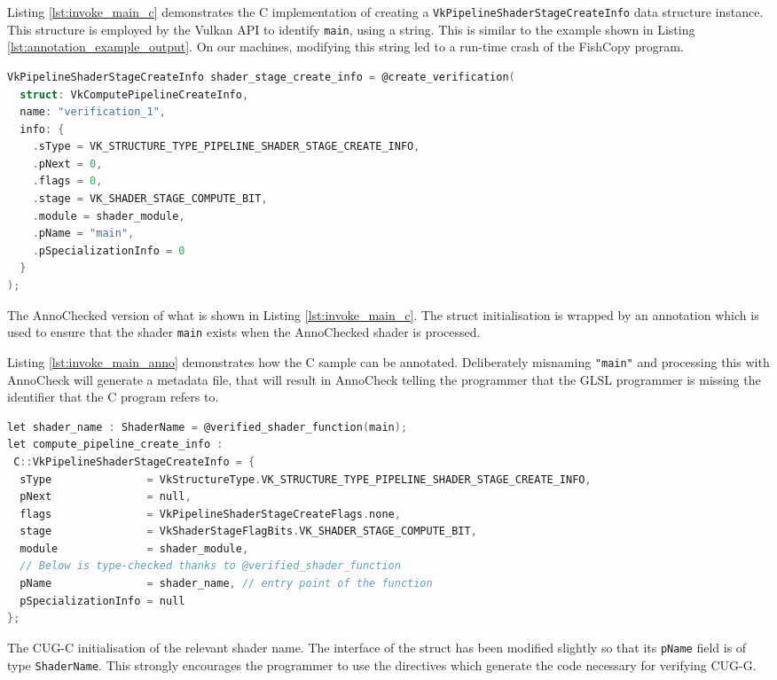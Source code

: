 \documentclass[a4paper,12pt,twoside,openright]{report}
\begin{document}
Listing \ref{lst:invoke_main_c} demonstrates the C implementation of creating a
\texttt{VkPipelineShaderStageCreateInfo} data structure instance. This
structure is employed by the Vulkan API to identify \texttt{main}, using a
string. This is similar to the example shown in Listing
\ref{lst:annotation_example_output}. On our machines, modifying this string led
to a run-time crash of the FishCopy program.

\begin{lstfloat}
\begin{lstlisting}[language=C]
VkPipelineShaderStageCreateInfo shader_stage_create_info = @create_verification(
  struct: VkComputePipelineCreateInfo,
  name: "verification_1",
  info: {
    .sType = VK_STRUCTURE_TYPE_PIPELINE_SHADER_STAGE_CREATE_INFO,
    .pNext = 0,
    .flags = 0,
    .stage = VK_SHADER_STAGE_COMPUTE_BIT,
    .module = shader_module,
    .pName = "main",
    .pSpecializationInfo = 0
  }
);
\end{lstlisting}
\caption{The AnnoChecked version of what is shown in Listing
\ref{lst:invoke_main_c}. The struct initialisation is wrapped by an annotation
which is used to ensure that the shader \texttt{main} exists when the
AnnoChecked shader is processed.}
\label{lst:invoke_main_anno}
\end{lstfloat}

Listing \ref{lst:invoke_main_anno} demonstrates how the C sample can be
annotated. Deliberately misnaming \texttt{"main"} and processing this with
AnnoCheck will generate a metadata file, that will result in AnnoCheck telling
the programmer that the GLSL programmer is missing the identifier that the C
program refers to.

\begin{lstfloat}
\begin{lstlisting}[language=C]
let shader_name : ShaderName = @verified_shader_function(main);
let compute_pipeline_create_info :
 C::VkPipelineShaderStageCreateInfo = {
  sType               = VkStructureType.VK_STRUCTURE_TYPE_PIPELINE_SHADER_STAGE_CREATE_INFO,
  pNext               = null,
  flags               = VkPipelineShaderStageCreateFlags.none,
  stage               = VkShaderStageFlagBits.VK_SHADER_STAGE_COMPUTE_BIT,
  module              = shader_module,
  // Below is type-checked thanks to @verified_shader_function
  pName               = shader_name, // entry point of the function
  pSpecializationInfo = null
};
\end{lstlisting}
\caption{The CUG-C initialisation of the relevant shader name. The interface of
the struct has been modified slightly so that its \texttt{pName} field is of
type \texttt{ShaderName}. This strongly encourages the programmer to use the
directives which generate the code necessary for verifying CUG-G.}
\label{lst:invoke_main_cugc}
\end{lstfloat}
\end{document}
